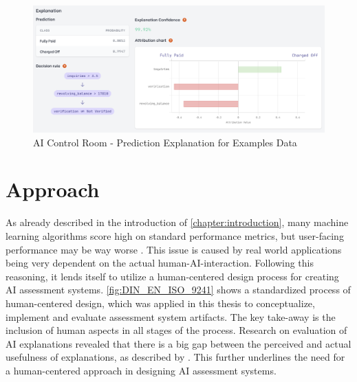 \documentclass[11pt,a4paper,english]{scrreprt}
\begin{document}
\begin{figure}[htbp]
    \centering
    \includegraphics[width=\textwidth]{img/screenshots/model_assessment_explanation.png}
    \caption{AI Control Room - Prediction Explanation for Examples Data}
    \label{fig:model_assessment_explanation}
\end{figure}
\clearpage

\section{Approach}
As already described in the introduction of \autoref{chapter:introduction}, many machine learning algorithms score high on standard performance metrics, but user-facing performance may be way worse \parencite{gordon_disagreement_2021}. This issue is caused by real world applications being very dependent on the actual human-AI-interaction. Following this reasoning, it lends itself to utilize a human-centered design process for creating AI assessment systems. \autoref{fig:DIN_EN_ISO_9241} shows a standardized process of human-centered design, which was applied in this thesis to conceptualize, implement and evaluate assessment system artifacts. The key take-away is the inclusion of human aspects in all stages of the process. Research on evaluation of AI explanations revealed that there is a big gap between the perceived and actual usefulness of explanations, as described by \textcite{ras_explainable_2021}. This further underlines the need for a human-centered approach in designing AI assessment systems.
\end{document}
